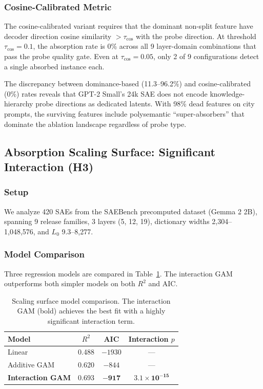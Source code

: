 \documentclass{article}
\begin{document}
\subsubsection{Cosine-Calibrated Metric}

The cosine-calibrated variant requires that the dominant non-split feature have decoder direction cosine similarity $> \tau_{\text{cos}}$ with the probe direction.
At threshold $\tau_{\text{cos}} = 0.1$, the absorption rate is 0\% across all 9 layer-domain combinations that pass the probe quality gate.
Even at $\tau_{\text{cos}} = 0.05$, only 2 of 9 configurations detect a single absorbed instance each.

The discrepancy between dominance-based (11.3--96.2\%) and cosine-calibrated (0\%) rates reveals that GPT-2 Small's 24k SAE does not encode knowledge-hierarchy probe directions as dedicated latents.
With 98\% dead features on city prompts, the surviving features include polysemantic ``super-absorbers'' that dominate the ablation landscape regardless of probe type.

\subsection{Absorption Scaling Surface: Significant Interaction (H3)}

\subsubsection{Setup}

We analyze 420 SAEs from the SAEBench precomputed dataset (Gemma 2 2B), spanning 9 release families, 3 layers (5, 12, 19), dictionary widths 2,304--1,048,576, and $L_0$ 9.3--8,277.

\subsubsection{Model Comparison}

Three regression models are compared in Table~\ref{tab:scaling}.
The interaction GAM outperforms both simpler models on both $R^2$ and AIC.

\begin{table}[t]
\caption{Scaling surface model comparison. The interaction GAM (bold) achieves the best fit with a highly significant interaction term.}
\label{tab:scaling}
\centering
\small
\begin{tabular}{@{}lccc@{}}
\toprule
Model & $R^2$ & AIC & Interaction $p$ \\
\midrule
Linear & 0.488 & $-1930$ & --- \\
Additive GAM & 0.620 & $-844$ & --- \\
\textbf{Interaction GAM} & $\mathbf{0.693}$ & $\mathbf{-917}$ & $\mathbf{3.1 \times 10^{-15}}$ \\
\bottomrule
\end{tabular}
\end{table}
\end{document}
